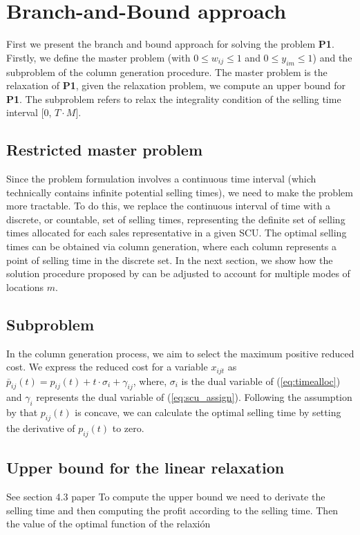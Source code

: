 \documentclass[12pt]{scrartcl}
\begin{document}
\section{Branch-and-Bound approach}
First we present the branch and bound approach for solving the problem \textbf{P1}. Firstly, we define the master problem (with $0 \leq  w_{ij} \leq 1$ and $0 \leq  y_{im} \leq 1$) and the subproblem of the column generation procedure. The master problem is the relaxation of \textbf{P1}, given the relaxation problem, we compute an upper bound for \textbf{P1}. The subproblem refers to relax the integrality condition of the selling time interval [0, $T \cdot M$].


\subsection{Restricted master problem}

Since the problem formulation involves a continuous time interval (which technically contains infinite potential selling times), we need to make the problem more tractable. To do this, we replace the continuous interval of time with a discrete, or countable, set of selling times, representing the definite set of selling times allocated for each sales representative in a given SCU. The optimal selling times can be obtained via column generation, where each column represents a point of selling time in the discrete set. In the next section, we show how the solution procedure proposed by \cite{Haase2014} can be adjusted to account for multiple modes of locations $m$.


\subsection{Subproblem}

In the column generation process, we aim to select the maximum positive reduced cost. We express the reduced cost for a variable $x_{ijt}$ as $\bar{p}_{ij}(t)=p_{ij}(t) + t \cdot \sigma_i + \gamma_{ij}$, where, $\sigma_i$ is the dual variable of (\ref{eq:timealloc}) and $\gamma_i$ represents the dual variable of (\ref{eq:scu_assign}). Following the assumption by \cite{Haase2014} that $p_{ij}(t)$ is concave, we can calculate the optimal selling time by setting the derivative of $p_{ij}(t)$ to zero.



\subsection{Upper bound for the linear relaxation}
See section 4.3 paper
To compute the upper bound we need to derivate the selling time and then computing the profit according to the selling time. Then the value of the optimal function of the relaxión
\end{document}
